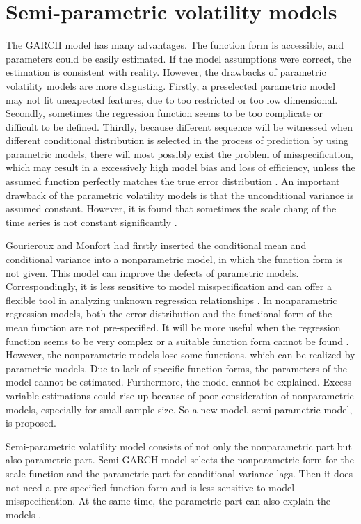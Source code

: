 \chapter{Semi-parametric volatility models}\label{semiparaGarch}

The GARCH model has many advantages. The function form is accessible, and parameters could be easily estimated. If the model assumptions were correct, the estimation is consistent with reality. However, the drawbacks of parametric volatility models are more disgusting. Firstly, a preselected parametric model may not fit unexpected features, due to too restricted or too low dimensional. Secondly, sometimes the regression function seems to be too complicate or difficult to be defined. Thirdly, because different sequence will be witnessed when different conditional distribution is selected in the process of prediction by using parametric models, there will most possibly exist the problem of misspecification, which may result in a excessively high model bias and loss of efficiency, unless the assumed function perfectly matches the true error distribution \citep{Di2011}. An important drawback of the parametric volatility models is that the unconditional variance is assumed constant. However, it is found that sometimes the scale chang of the time series is not constant significantly \citep{beran2001volatility}.

Gourieroux and Monfort had firstly inserted the conditional mean and conditional variance into a nonparametric model, in which the function form is not given. This model can improve the defects of parametric models. Correspondingly, it is less sensitive to model misspecification and can offer a flexible tool in analyzing unknown regression relationships 
\citep{Gourieroux1992}. In nonparametric regression models, both the error distribution and the functional form of the mean function are not pre-specified. It will be more useful when the regression function seems to be very complex or a suitable function form cannot be found \citep{Eubank1993}. However, the nonparametric models lose some functions, which can be realized by parametric models. Due to lack of specific function forms, the parameters of the model cannot be estimated. Furthermore, the model cannot be explained. Excess variable estimations could rise up because of poor consideration of nonparametric models, especially for small sample size. So a new model, semi-parametric model, is proposed. 

Semi-parametric volatility model consists of not only the nonparametric part but also parametric part. Semi-GARCH model selects the nonparametric form for the scale function and the parametric part for conditional variance lags. Then it does not need a pre-specified function form and is less sensitive to model misspecification. At the same time, the parametric part can also explain the models \citep{Di2011}.

